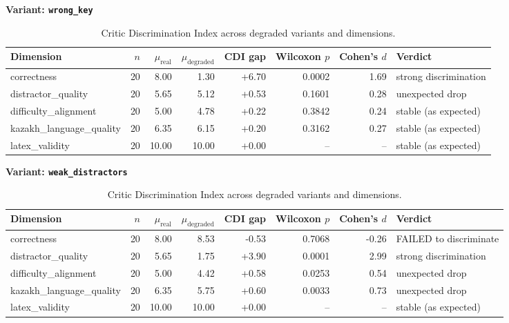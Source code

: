 \begin{table}[t]
\centering
\caption{Critic Discrimination Index across degraded variants and dimensions.}
\label{tab:cdi}
\vspace{0.5em}
\textbf{Variant: \texttt{wrong_key}}\\
\begin{tabular}{lrrrrrrl}
\hline
Dimension & $n$ & $\mu_\text{real}$ & $\mu_\text{degraded}$ & CDI gap & Wilcoxon $p$ & Cohen's $d$ & Verdict \\
\hline
correctness & 20 & 8.00 & 1.30 & +6.70 & 0.0002 & 1.69 & strong discrimination \\
distractor\_quality & 20 & 5.65 & 5.12 & +0.53 & 0.1601 & 0.28 & unexpected drop \\
difficulty\_alignment & 20 & 5.00 & 4.78 & +0.22 & 0.3842 & 0.24 & stable (as expected) \\
kazakh\_language\_quality & 20 & 6.35 & 6.15 & +0.20 & 0.3162 & 0.27 & stable (as expected) \\
latex\_validity & 20 & 10.00 & 10.00 & +0.00 & -- & -- & stable (as expected) \\
\hline
\end{tabular}
\vspace{0.5em}
\textbf{Variant: \texttt{weak_distractors}}\\
\begin{tabular}{lrrrrrrl}
\hline
Dimension & $n$ & $\mu_\text{real}$ & $\mu_\text{degraded}$ & CDI gap & Wilcoxon $p$ & Cohen's $d$ & Verdict \\
\hline
correctness & 20 & 8.00 & 8.53 & -0.53 & 0.7068 & -0.26 & FAILED to discriminate \\
distractor\_quality & 20 & 5.65 & 1.75 & +3.90 & 0.0001 & 2.99 & strong discrimination \\
difficulty\_alignment & 20 & 5.00 & 4.42 & +0.58 & 0.0253 & 0.54 & unexpected drop \\
kazakh\_language\_quality & 20 & 6.35 & 5.75 & +0.60 & 0.0033 & 0.73 & unexpected drop \\
latex\_validity & 20 & 10.00 & 10.00 & +0.00 & -- & -- & stable (as expected) \\
\hline
\end{tabular}
\end{table}
